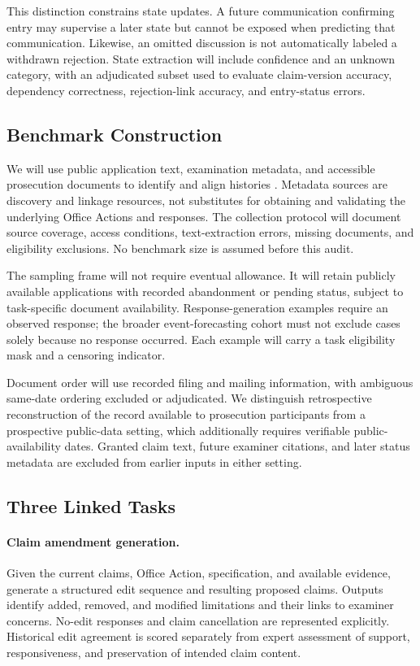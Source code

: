 \documentclass[11pt]{article}
\begin{document}
This distinction constrains state updates. A future communication confirming entry may supervise a later state but cannot be exposed when predicting that communication. Likewise, an omitted discussion is not automatically labeled a withdrawn rejection. State extraction will include confidence and an unknown category, with an adjudicated subset used to evaluate claim-version accuracy, dependency correctness, rejection-link accuracy, and entry-status errors.

\subsection{Benchmark Construction}
\label{sec:approach-data}

We will use public application text, examination metadata, and accessible prosecution documents to identify and align histories \citep{suzgun2023hupd,uspto2017officeactions,uspto2022patex}. Metadata sources are discovery and linkage resources, not substitutes for obtaining and validating the underlying Office Actions and responses. The collection protocol will document source coverage, access conditions, text-extraction errors, missing documents, and eligibility exclusions. No benchmark size is assumed before this audit.

The sampling frame will not require eventual allowance. It will retain publicly available applications with recorded abandonment or pending status, subject to task-specific document availability. Response-generation examples require an observed response; the broader event-forecasting cohort must not exclude cases solely because no response occurred. Each example will carry a task eligibility mask and a censoring indicator.

Document order will use recorded filing and mailing information, with ambiguous same-date ordering excluded or adjudicated. We distinguish retrospective reconstruction of the record available to prosecution participants from a prospective public-data setting, which additionally requires verifiable public-availability dates. Granted claim text, future examiner citations, and later status metadata are excluded from earlier inputs in either setting.

\subsection{Three Linked Tasks}
\label{sec:approach-tasks}

\paragraph{Claim amendment generation.}
Given the current claims, Office Action, specification, and available evidence, generate a structured edit sequence and resulting proposed claims. Outputs identify added, removed, and modified limitations and their links to examiner concerns. No-edit responses and claim cancellation are represented explicitly. Historical edit agreement is scored separately from expert assessment of support, responsiveness, and preservation of intended claim content.
\end{document}
